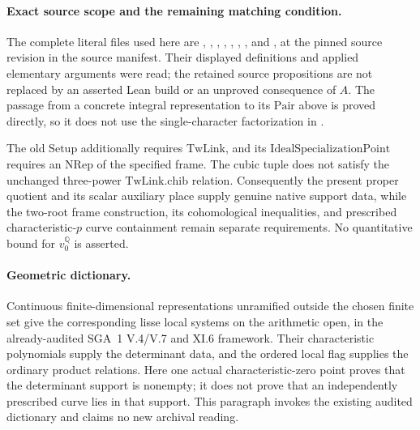 \paragraph{Exact source scope and the remaining matching condition.}
The complete literal files used here are
,
,
,
,
,
,
, and
, at the pinned source revision in the
source manifest.
Their displayed definitions and applied elementary arguments
were read; the retained source propositions are not replaced by
an asserted Lean build or an unproved consequence of \(A\).
The passage from a concrete integral representation to its
\(\mathrm{Pair}\) above is proved directly, so it does not use
the single-character factorization in .

The old \(\mathrm{Setup}\) additionally requires
\(\mathrm{TwLink}\), and its
\(\mathrm{IdealSpecializationPoint}\) requires an
\(\mathrm{NRep}\) of the specified frame.
The cubic tuple does not satisfy the unchanged three-power
\(\mathrm{TwLink.chib}\) relation.
Consequently the present proper quotient and its scalar
auxiliary place supply genuine native support data, while the
two-root frame construction, its cohomological inequalities,
and prescribed characteristic-\(p\) curve containment remain
separate requirements.
No quantitative bound for \(v_0^{\mathbb Q}\) is asserted.

\paragraph{Geometric dictionary.}
Continuous finite-dimensional representations unramified outside
the chosen finite set give the corresponding lisse local systems
on the arithmetic open, in the already-audited
SGA~1 V.4/V.7 and XI.6 framework.
Their characteristic polynomials supply the determinant data,
and the ordered local flag supplies the ordinary product
relations.
Here one actual characteristic-zero point proves that the
determinant support is nonempty; it does not prove that an
independently prescribed curve lies in that support.
This paragraph invokes the existing audited dictionary and
claims no new archival reading.

